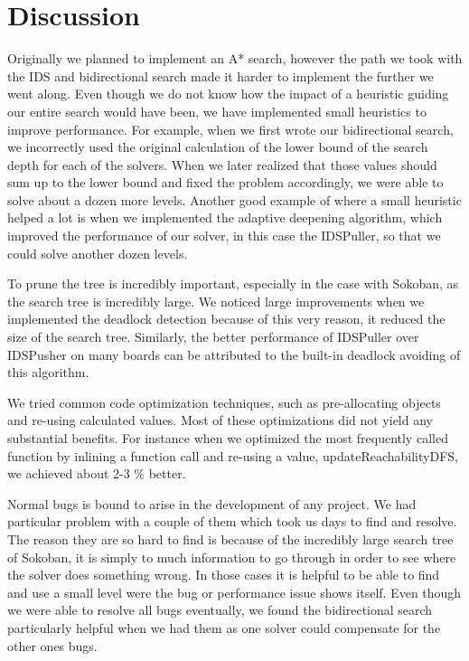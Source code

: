 \documentclass[a4paper,11pt]{article}
\renewcommand{\*}[0]{\cdot}
\begin{document}
\part*{Discussion}

Originally we planned to implement an A* search, however the path we took with
the IDS and bidirectional search made it harder to implement the further we went
along. Even though we do not know how the impact of a heuristic guiding our
entire search would have been, we have implemented small heuristics to improve
performance. For example, when we first wrote our bidirectional search, we
incorrectly used the original calculation of the lower bound of the search depth
for each of the solvers. When we later realized that those values should sum up
to the lower bound and fixed the problem accordingly, we were able to solve
about a dozen more levels. Another good example of where a small heuristic
helped a lot is when we implemented the adaptive deepening algorithm, which
improved the performance of our solver, in this case the IDSPuller, so that we
could solve another dozen levels.

To prune the tree is incredibly important, especially in the case with Sokoban,
as the search tree is incredibly large. We noticed large improvements when we
implemented the deadlock detection because of this very reason, it reduced the
size of the search tree. Similarly, the better performance of IDSPuller over
IDSPusher on many boards can be attributed to the built-in deadlock avoiding of
this algorithm.

We tried common code optimization techniques, such as pre-allocating objects and
re-using calculated values. Most of these optimizations did not yield any
substantial benefits. For instance when we optimized the most frequently called
function by inlining a function call and re-using a value,
updateReachabilityDFS, we achieved about 2-3 \% better.


Normal bugs is bound to arise in the development of any project. We had
particular problem with a couple of them which took us days to find and resolve.
The reason they are so hard to find is because of the incredibly large search
tree of Sokoban, it is simply to much information to go through in order to see
where the solver does something wrong. In those cases it is helpful to be able
to find and use a small level were the bug or performance issue shows itself.
Even though we were able to resolve all bugs eventually, we found the
bidirectional search particularly helpful when we had them as one solver could
compensate for the other ones bugs.
\end{document}
